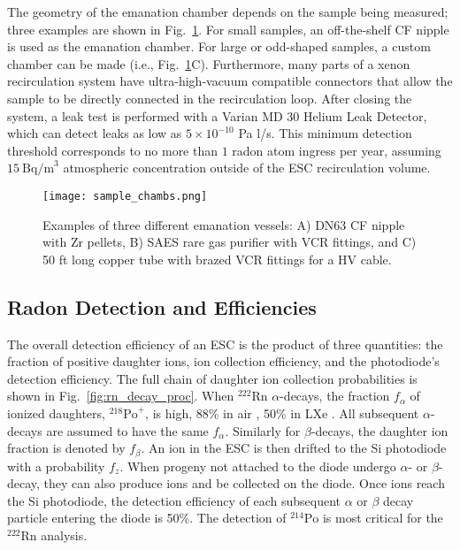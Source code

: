 \documentclass[final,3p,times]{elsarticle}
\begin{document}
The geometry of the emanation chamber depends on the sample being measured; three examples are shown in Fig.~\ref{fig:sample_chambs}. 
For small samples, an off-the-shelf CF nipple is used as the emanation chamber. For large or odd-shaped samples, a custom chamber can be made (i.e., Fig.~\ref{fig:sample_chambs}C).
Furthermore, many parts of a xenon recirculation system have ultra-high-vacuum compatible connectors that allow the sample to be directly connected in the recirculation loop. %
After closing the system, a leak test is performed with a Varian MD 30 Helium Leak Detector, which can detect leaks as low as $5 \times 10^{-10}$ Pa l/s. 
This minimum detection threshold corresponds to no more than $1$ radon atom ingress per year, assuming $15~\text{Bq/m}^3$ atmospheric concentration outside of the ESC recirculation volume.
\begin{figure}
\centering
  \texttt{[image: sample\_chambs.png]}
  \caption{Examples of three different emanation vessels: A) DN63 CF nipple with Zr pellets, B) SAES rare gas purifier with VCR fittings, and C) 50 ft long copper tube with brazed VCR fittings for a HV cable.}
  \label{fig:sample_chambs}
\end{figure}


\subsection{Radon Detection and Efficiencies}
\label{sec: rn_decay_eff}
The overall detection efficiency of an ESC is the product of three quantities: the fraction of positive daughter ions, ion collection efficiency, and the photodiode's detection efficiency. 
The full chain of daughter ion collection probabilities is shown in Fig.~\ref{fig:rn_decay_proc}.
When $^{222}\text{Rn}$ $\alpha$-decays, the fraction $f_\alpha$ of ionized daughters, $^{218}\text{Po}^+$, is high, 88\% in air \cite{HOPKE1989299, PAGELKOPF20031057}, 50\% in LXe \cite{alphaion}.
All subsequent $\alpha$-decays are assumed to have the same $f_\alpha$.
Similarly for $\beta$-decays, the daughter ion fraction is denoted by $f_\beta$.
An ion in the ESC is then drifted to the Si photodiode with a probability $f_z$.
When progeny not attached to the diode undergo $\alpha$- or $\beta$-decay, they can also produce ions and be collected on the diode.
Once ions reach the Si photodiode, the detection efficiency of each subsequent $\alpha$ or $\beta$ decay particle entering the diode is 50\%. 
The detection of $^{214}\text{Po}$ is most critical for the $^{222}\text{Rn}$ analysis.
\end{document}
